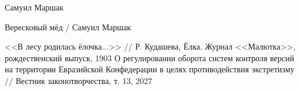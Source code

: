 Самуил Маршак
\begin{thebibliography}{99}

 Вересковый мёд / Самуил Маршак

 <<В лесу родилась ёлочка...>> // Р. Кудашева, Ёлка. Журнал <<Малютка>>, рождественский выпуск, 1903
О регулировании оборота систем контроля версий на территории Евразийской Конфедерации в целях противодействия экстретизму
// Вестник законотворчества, т. 13, 2027

\end{thebibliography}

